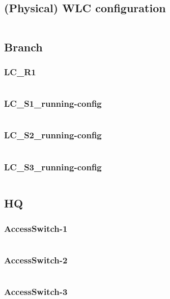\subsection{(Physical) WLC configuration} \label{configwlc}
\inputminted[fontsize=\tiny,linenos,breaklines]{text}{./wirelessimplementation/wlc.cisco}

\subsection{Branch} \label{configbranch}
\subsubsection{LC\_R1} \label{configwlc}
\inputminted[fontsize=\tiny,linenos,breaklines]{text}{./Config/Branch/LC-R1.txt}
\subsubsection{LC\_S1\_running-config} \label{configwlc}
\inputminted[fontsize=\tiny,linenos,breaklines]{text}{./Config/Branch/LC-S1-running-config.txt}
\subsubsection{LC\_S2\_running-config} \label{configwlc}
\inputminted[fontsize=\tiny,linenos,breaklines]{text}{./Config/Branch/LC-S2-running-config.txt}
\subsubsection{LC\_S3\_running-config} \label{configwlc}
\inputminted[fontsize=\tiny,linenos,breaklines]{text}{./Config/Branch/LC-S3-running-config.txt}

\subsection{HQ} \label{confighq}
\subsubsection{AccessSwitch-1} \label{configwlc}
\inputminted[fontsize=\tiny,linenos,breaklines]{text}{./Config/HQ/AccessSwitch-1.txt}
\subsubsection{AccessSwitch-2} \label{configwlc}
\inputminted[fontsize=\tiny,linenos,breaklines]{text}{./Config/HQ/AccessSwitch-2.txt}
\subsubsection{AccessSwitch-3} \label{configwlc}
\inputminted[fontsize=\tiny,linenos,breaklines]{text}{./Config/HQ/AccessSwitch-3.txt}
